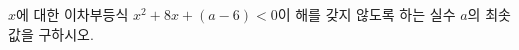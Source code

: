 \hspace*{2mm}\begin{minipage}[t]{\dimexpr\linewidth-2mm\relax}\vspace{0pt}
$x$에 대한 이차부등식 $x^2+8x+(a-6)<0$이 해를 갖지 않도록 하는 실수 $a$의 최솟값을 구하시오.\end{minipage}

